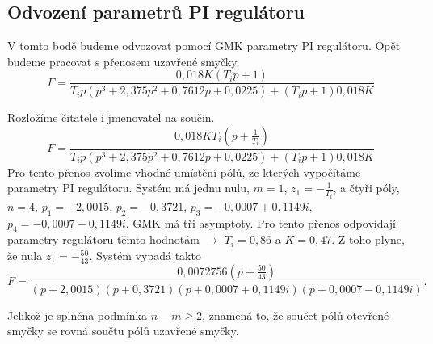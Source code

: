 \documentclass{article}
\begin{document}
		\subsection{Odvození parametrů PI regulátoru}
			V tomto bodě budeme odvozovat pomocí GMK parametry PI regulátoru. Opět budeme pracovat s přenosem uzavřené smyčky. 
			\[F=\frac{0,018K(T_ip+1)}{T_ip(p^3 + 2,375 p^2 + 0,7612 p + 0,0225)+(T_ip+1)0,018K}\]
			
			Rozložíme čitatele i jmenovatel na součin.
			\[F=\frac{0,018KT_i(p+\frac{1}{T_i})}{T_ip(p^3 + 2,375 p^2 + 0,7612 p + 0,0225)+(T_ip+1)0,018K}\]
			Pro tento přenos zvolíme vhodné umístění pólů, ze kterých vypočítáme parametry PI regulátoru. Systém má jednu nulu, $m=1$, $z_1=-\frac{1}{T_i}$, a čtyři póly, $n=4$, $p_1=-2,0015$, $p_2=-0,3721$, $p_3= -0,0007 + 0,1149i$, $p_4= -0,0007 - 0,1149i$. GMK má tři asymptoty. Pro tento přenos odpovídají parametry regulátoru těmto hodnotám $\rightarrow$ $T_i=0,86$ a $K=0,47$. Z toho plyne, že nula $z_1=-\frac{50}{43}$. Systém vypadá takto 
			\[F=\frac{0,0072756(p+\frac{50}{43})}{(p+2,0015)(p+0,3721)(p+0,0007 + 0,1149i)(p+0,0007 - 0,1149i)}.\]
			
			Jelikož je splněna podmínka $n-m \geq 2$, znamená to, že součet pólů otevřené smyčky se rovná součtu pólů uzavřené smyčky.
			
\end{document}
